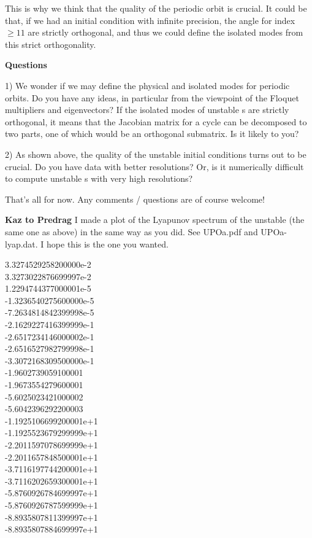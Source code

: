 \begin{description}
This is why we think that the quality of the periodic orbit is crucial.
It could be that, if we had an initial condition with infinite
precision, the angle for index $\geq 11$ are strictly orthogonal, and thus we
could define the isolated modes from this strict orthogonality.


\textbf{Questions}

1) We wonder if we may define the physical and isolated modes for
periodic orbits. Do you have any ideas, in particular from the viewpoint
of the Floquet multipliers and eigenvectors? If the isolated modes of
{unstable \po}s are strictly orthogonal, it means that the Jacobian matrix for a
cycle can be decomposed to two parts, one of which would be an
orthogonal submatrix. Is it likely to you?

2) As shown above, the quality of the {unstable \po} initial conditions turns out
to be crucial. Do you have data with better resolutions? Or, is it
numerically difficult to compute {unstable \po}s with very high resolutions?

That's all for now. Any comments / questions are of course welcome!


\textbf{Kaz to Predrag} I made a plot of the Lyapunov spectrum of
the {unstable \po} (the same one as above) in the same way as you did. See UPOa.pdf
and UPOa-lyap.dat. I hope this is the one you wanted.

                            \noindent
 3.3274529258200000e-2    \\
 3.3273022876699997e-2    \\
 1.2294744377000001e-5    \\
 -1.3236540275600000e-5    \\
 -7.2634814842399998e-5    \\
 -2.1629227416399999e-1    \\
 -2.6517234146000002e-1    \\
 -2.6516527982799998e-1    \\
 -3.3072168309500000e-1    \\
 -1.9602739059100001    \\
 -1.9673554279600001    \\
 -5.6025023421000002    \\
 -5.6042396292200003    \\
 -1.1925106699200001e+1    \\
 -1.1925523679299999e+1    \\
 -2.2011597078699999e+1    \\
 -2.2011657848500001e+1    \\
 -3.7116197744200001e+1    \\
 -3.7116202659300001e+1    \\
 -5.8760926784699997e+1    \\
 -5.8760926787599999e+1    \\
 -8.8935807811399997e+1    \\
 -8.8935807884699997e+1    \\


\end{description}
